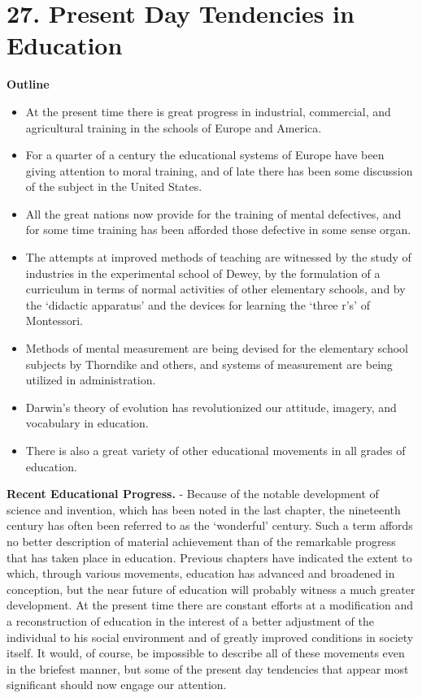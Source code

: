 \documentclass[]{book}
\providecommand{\tightlist}{%
  \setlength{\itemsep}{0pt}\setlength{\parskip}{0pt}}
\begin{document}
\hypertarget{present-day-tendencies-in-education}{%
\chapter{27. Present Day Tendencies in Education}\label{present-day-tendencies-in-education}}

\textbf{Outline}

\begin{itemize}
\tightlist
\item
  At the present time there is great progress in industrial, commercial, and agricultural training in the schools of Europe and America.
\item
  For a quarter of a century the educational systems of Europe have been giving attention to moral training, and of late there has been some discussion of the subject in the United States.
\item
  All the great nations now provide for the training of mental defectives, and for some time training has been afforded those defective in some sense organ.
\item
  The attempts at improved methods of teaching are witnessed by the study of industries in the experimental school of Dewey, by the formulation of a curriculum in terms of normal activities of other elementary schools, and by the `didactic apparatus' and the devices for learning the `three r's' of Montessori.
\item
  Methods of mental measurement are being devised for the elementary school subjects by Thorndike and others, and systems of measurement are being utilized in administration.
\item
  Darwin's theory of evolution has revolutionized our attitude, imagery, and vocabulary in education.
\item
  There is also a great variety of other educational movements in all grades of education.
\end{itemize}

\textbf{Recent Educational Progress.} - Because of the notable development of science and invention, which has been noted in the last chapter, the nineteenth century has often been referred to as the `wonderful' century. Such a term affords no better description of material achievement than of the remarkable progress that has taken place in education. Previous chapters have indicated the extent to which, through various movements, education has advanced and broadened in conception, but the near future of education will probably witness a much greater development. At the present time there are constant efforts at a modification and a reconstruction of education in the interest of a better adjustment of the individual to his social environment and of greatly improved conditions in society itself. It would, of course, be impossible to describe all of these movements even in the briefest manner, but some of the present day tendencies that appear most significant should now engage our attention.
\end{document}
